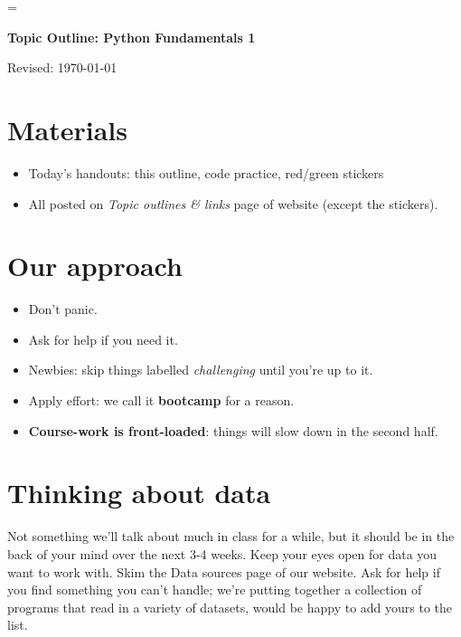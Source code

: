 


\pagestyle{headandfoot}
\runningheadrule
\firstpageheadrule
{}
\runningheader{}{}{}
\runningfooter{}{}{}


\parskip=\bigskipamount

\bigskip\bigskip
\centerline{\Large \bf Topic Outline:  Python Fundamentals 1}
\centerline{Revised: \today}


\section*{Materials}

\begin{itemize}
\item  Today's handouts:  this outline, code practice, red/green stickers
\item  All posted on {\it Topic outlines \& links\/} page of website (except the stickers).
\end{itemize}


\section*{Our approach}

\begin{itemize}
\item Don't panic.
\item Ask for help if you need it.
\item Newbies:  skip things labelled {\it challenging\/} until you're up to it.
\item Apply effort: we call it {\bf bootcamp} for a reason.
\item {\bf Course-work is front-loaded}:  things will slow down in the second half.
\end{itemize}


\section*{Thinking about data}

Not something we'll talk about much in class for a while, but it should be in the back of
your mind over the next 3-4 weeks.  Keep your eyes open for data you want to work with.
Skim the Data sources page of our website.
Ask for help if you find something you can't handle; we're putting together
a collection of programs that read in a variety of datasets, would be happy to add yours
to the list.


